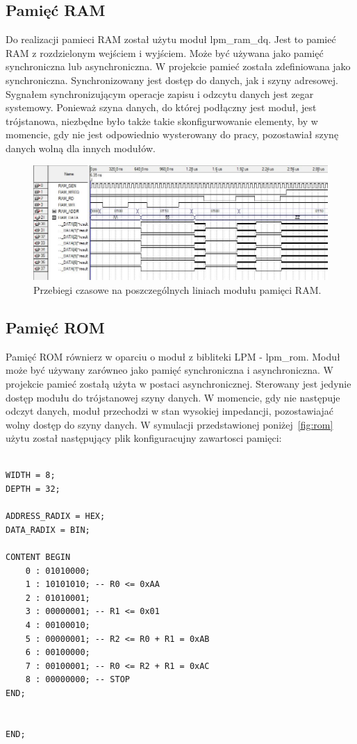 \documentclass[a4paper,12pt]{report}
\begin{document}
\subsection{Pamięć RAM}
Do realizacji pamieci RAM został użytu moduł lpm\_ram\_dq. Jest to pamieć RAM z rozdzielonym wejściem i wyjściem. Może być używana jako pamięć synchroniczna lub asynchroniczna. W projekcie pamieć została zdefiniowana jako synchroniczna. Synchronizowany jest dostęp do danych, jak i szyny adresowej. Sygnałem synchronizującym operacje zapisu i odzcytu danych jest zegar systemowy. Ponieważ szyna danych, do której podłączny jest moduł, jest trójstanowa, niezbędne było także takie skonfigurwowanie elementy, by w momencie, gdy nie jest odpowiednio wysterowany do pracy, pozostawiał szynę danych wolną dla innych modułów.

\begin{figure}[h]
\centering
\includegraphics[width=15cm]{./pict/ram.jpg}
\caption{Przebiegi czasowe na poszczególnych liniach modułu pamięci RAM.}
\label{fig:ram}
\end{figure}

\subsection{Pamięć ROM}
Pamięć ROM równierz w oparciu o moduł z bibliteki LPM - lpm\_rom. Moduł może być używany zarówneo  jako pamięć synchroniczna i asynchroniczna. W projekcie pamieć zostałą użyta w postaci asynchronicznej. Sterowany jest jedynie dostęp modułu do trójstanowej szyny danych. W momencie, gdy nie następuje odczyt danych, moduł przechodzi w stan wysokiej impedancji, pozostawiajać wolny dostęp do szyny danych.
W symulacji przedstawionej poniżej~\ref{fig:rom} użytu został następujący plik konfiguracujny zawartosci pamięci:

\begin{lstlisting}[caption=Plik wynikowy dla symulacji~\ref{fig:rom},language=ahdl]

WIDTH = 8;
DEPTH = 32;

ADDRESS_RADIX = HEX;
DATA_RADIX = BIN;

CONTENT BEGIN
	0 : 01010000;
	1 : 10101010; -- R0 <= 0xAA
	2 : 01010001;
	3 : 00000001; -- R1 <= 0x01
	4 : 00100010;
	5 : 00000001; -- R2 <= R0 + R1 = 0xAB
	6 : 00100000;
	7 : 00100001; -- R0 <= R2 + R1 = 0xAC
	8 : 00000000; -- STOP
END;


END;
\end{lstlisting}
\lstset{
tabsize=4
}
\end{document}
